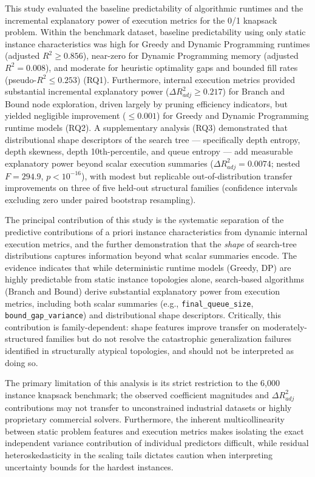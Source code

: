 \documentclass[11pt,a4paper]{article}
\begin{document}
This study evaluated the baseline predictability of algorithmic runtimes and the incremental explanatory power of execution metrics for the 0/1 knapsack problem. Within the benchmark dataset, baseline predictability using only static instance characteristics was high for Greedy and Dynamic Programming runtimes (adjusted $R^2 \ge 0.856$), near-zero for Dynamic Programming memory (adjusted $R^2 = 0.008$), and moderate for heuristic optimality gaps and bounded fill rates (pseudo-$R^2 \le 0.253$) (RQ1). Furthermore, internal execution metrics provided substantial incremental explanatory power ($\Delta R^2_{adj} \ge 0.217$) for Branch and Bound node exploration, driven largely by pruning efficiency indicators, but yielded negligible improvement ($\le 0.001$) for Greedy and Dynamic Programming runtime models (RQ2). A supplementary analysis (RQ3) demonstrated that distributional shape descriptors of the search tree --- specifically depth entropy, depth skewness, depth 10th-percentile, and queue entropy --- add measurable explanatory power beyond scalar execution summaries ($\Delta R^2_{adj} = 0.0074$; nested $F = 294.9$, $p < 10^{-16}$), with modest but replicable out-of-distribution transfer improvements on three of five held-out structural families (confidence intervals excluding zero under paired bootstrap resampling).

The principal contribution of this study is the systematic separation of the predictive contributions of a priori instance characteristics from dynamic internal execution metrics, and the further demonstration that the \emph{shape} of search-tree distributions captures information beyond what scalar summaries encode. The evidence indicates that while deterministic runtime models (Greedy, DP) are highly predictable from static instance topologies alone, search-based algorithms (Branch and Bound) derive substantial explanatory power from execution metrics, including both scalar summaries (e.g., \texttt{final\_queue\_size}, \texttt{bound\_gap\_variance}) and distributional shape descriptors. Critically, this contribution is family-dependent: shape features improve transfer on moderately-structured families but do not resolve the catastrophic generalization failures identified in structurally atypical topologies, and should not be interpreted as doing so.

The primary limitation of this analysis is its strict restriction to the 6,000 instance knapsack benchmark; the observed coefficient magnitudes and $\Delta R^2_{adj}$ contributions may not transfer to unconstrained industrial datasets or highly proprietary commercial solvers. Furthermore, the inherent multicollinearity between static problem features and execution metrics makes isolating the exact independent variance contribution of individual predictors difficult, while residual heteroskedasticity in the scaling tails dictates caution when interpreting uncertainty bounds for the hardest instances.
\end{document}
